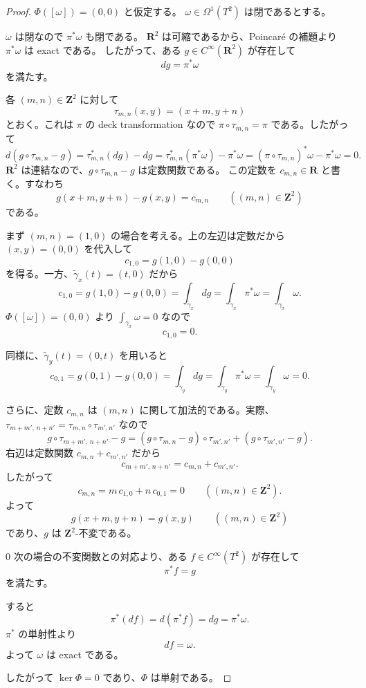 \documentclass[uplatex,dvipdfmx,11pt]{jsarticle}
\newcommand{\R}{\mathbf{R}}
\newcommand{\Z}{\mathbf{Z}}
\theoremstyle{definition}
\begin{document}
\begin{proof}
\(\Phi([\omega])=(0,0)\) と仮定する。
\(\omega\in\Omega^1(T^2)\) は閉であるとする。

\(\omega\) は閉なので \(\pi^*\omega\) も閉である。
\(\R^2\) は可縮であるから、Poincar\'e の補題より \(\pi^*\omega\) は exact である。
したがって、ある \(g\in C^\infty(\R^2)\) が存在して
\[
dg=\pi^*\omega
\]
を満たす。

各 \((m,n)\in\Z^2\) に対して
\[
\tau_{m,n}(x,y)=(x+m,y+n)
\]
とおく。これは \(\pi\) の deck transformation なので
\(\pi\circ\tau_{m,n}=\pi\) である。したがって
\[
d(g\circ\tau_{m,n}-g)
=
\tau_{m,n}^*(dg)-dg
=
\tau_{m,n}^*(\pi^*\omega)-\pi^*\omega
=
(\pi\circ\tau_{m,n})^*\omega-\pi^*\omega
=
0.
\]
\(\R^2\) は連結なので、\(g\circ\tau_{m,n}-g\) は定数関数である。
この定数を \(c_{m,n}\in\R\) と書く。すなわち
\[
g(x+m,y+n)-g(x,y)=c_{m,n}
\qquad ((m,n)\in\Z^2)
\]
である。

\medskip

まず \((m,n)=(1,0)\) の場合を考える。上の左辺は定数だから
\((x,y)=(0,0)\) を代入して
\[
c_{1,0}=g(1,0)-g(0,0)
\]
を得る。一方、\(\widetilde{\gamma}_x(t)=(t,0)\) だから
\[
c_{1,0}
=
g(1,0)-g(0,0)
=
\int_{\widetilde{\gamma}_x} dg
=
\int_{\widetilde{\gamma}_x}\pi^*\omega
=
\int_{\gamma_x}\omega.
\]
\(\Phi([\omega])=(0,0)\) より \(\int_{\gamma_x}\omega=0\) なので
\[
c_{1,0}=0.
\]

同様に、\(\widetilde{\gamma}_y(t)=(0,t)\) を用いると
\[
c_{0,1}
=
g(0,1)-g(0,0)
=
\int_{\widetilde{\gamma}_y} dg
=
\int_{\widetilde{\gamma}_y}\pi^*\omega
=
\int_{\gamma_y}\omega
=0.
\]

\medskip

さらに、定数 \(c_{m,n}\) は \((m,n)\) に関して加法的である。実際、
\(\tau_{m+m',\,n+n'}=\tau_{m,n}\circ\tau_{m',n'}\) なので
\[
g\circ\tau_{m+m',\,n+n'}-g
=
(g\circ\tau_{m,n}-g)\circ\tau_{m',n'}
+
(g\circ\tau_{m',n'}-g).
\]
右辺は定数関数 \(c_{m,n}+c_{m',n'}\) だから
\[
c_{m+m',\,n+n'}
=
c_{m,n}+c_{m',n'}.
\]
したがって
\[
c_{m,n}=m\,c_{1,0}+n\,c_{0,1}=0
\qquad ((m,n)\in\Z^2).
\]
よって
\[
g(x+m,y+n)=g(x,y)
\qquad ((m,n)\in\Z^2)
\]
であり、\(g\) は \(\Z^2\)-不変である。

\medskip

\(0\) 次の場合の不変関数との対応より、ある \(f\in C^\infty(T^2)\) が存在して
\[
\pi^*f=g
\]
を満たす。

すると
\[
\pi^*(df)=d(\pi^*f)=dg=\pi^*\omega.
\]
\(\pi^*\) の単射性より
\[
df=\omega.
\]
よって \(\omega\) は exact である。

したがって \(\ker\Phi=0\) であり、\(\Phi\) は単射である。
\end{proof}
\end{document}
